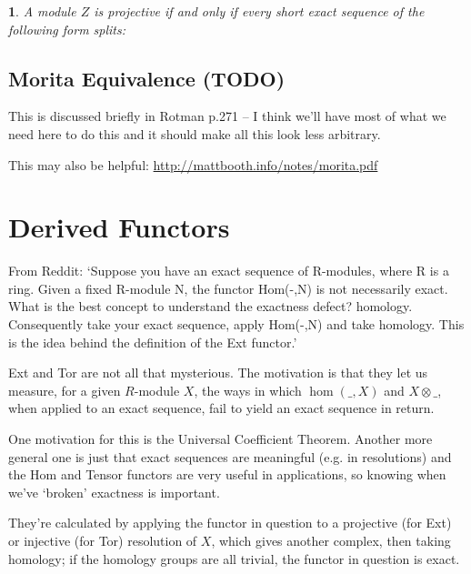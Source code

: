 \documentclass[oneside,english]{amsbook}
\numberwithin{section}{chapter}
\theoremstyle{plain}
\newtheorem{thm}{\protect\theoremname}
\theoremstyle{definition}
\providecommand{\theoremname}{Theorem}
\begin{document}
			\begin{thm}
				A module $Z$ is projective if and only if every short exact sequence of the following form splits:
				
				\begin{center}
				\end{center}				
			\end{thm}
			
		\section{Morita Equivalence (TODO)}
		
			This is discussed briefly in Rotman p.271 -- I think we'll have most of what we need here to do this and it should make all this look less arbitrary.
			
			This may also be helpful: \url{http://mattbooth.info/notes/morita.pdf}
		
	\chapter{Derived Functors}
	
		From Reddit: `Suppose you have an exact sequence of R-modules, where R is a ring. Given a fixed R-module N, the functor Hom(-,N) is not necessarily exact. What is the best concept to understand the exactness defect? homology. Consequently take your exact sequence, apply Hom(-,N) and take homology. This is the idea behind the definition of the Ext functor.'
		
		Ext and Tor are not all that mysterious. The motivation is that they let us measure, for a given $R$-module $X$, the ways in which $\hom(\_, X)$ and $X\otimes\_$, when applied to an exact sequence, fail to yield an exact sequence in return. 
		
		One motivation for this is the Universal Coefficient Theorem. Another more general one is just that exact sequences are meaningful (e.g. in resolutions) and the Hom and Tensor functors are very useful in applications, so knowing when we've `broken' exactness is important.
		
		They're calculated by applying the functor in question to a projective (for Ext) or injective (for Tor) resolution of $X$, which gives another complex, then taking homology; if the homology groups are all trivial, the functor in question is exact. 
	
\end{document}

